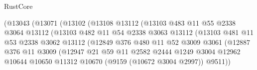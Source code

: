 \begin{lexlean}{RustCore}
\begin{coremodule}
                              (@13043
                                (@13071
                                  (@13102
                                    (@13108
                                      @13112
                                      (@13103
                                        @483
                                        @11
                                        @55
                                        @2338
                                        @3064
                                        @13112
                                        (@13103
                                          @482
                                          @11
                                          @54
                                          @2338
                                          @3063
                                          @13112
                                          (@13103
                                            @481
                                            @11
                                            @53
                                            @2338
                                            @3062
                                            @13112
                                            (@12849
                                              @376
                                              @480
                                              @11
                                              @52
                                              @3009
                                              @3061
                                              (@12887
                                                @376
                                                @11
                                                @3009
                                                (@12947
                                                  @21
                                                  @59
                                                  @11
                                                  @2582
                                                  @2444
                                                  @1249
                                                  @3004
                                                  @12962
                                                  @10644
                                                  @10650
                                                  @11312
                                                  @10670
                                                  (@9159 (@10672 @3004 @2997))
                                                  @9511))

\end{coremodule}
\end{lexlean}

